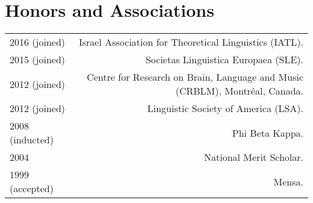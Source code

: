 \documentclass[12pt,letterpaper,twoside]{article}
\makeatletter
\newenvironment{cvsection}{%
  \setlength{\extrarowheight}{0.70ex}
  \begin{longtable}[l]{@{} L R @{}}
}{%
  \end{longtable}
}
\makeatother
\begin{document}
\section*{Honors and Associations}

\begin{cvsection}
  2016 {\footnotesize (joined)} & Israel Association for Theoretical Linguistics (IATL).\\
  2015 {\footnotesize (joined)} & Societas Linguistica Europaea (SLE).\\
  2012 {\footnotesize (joined)} & Centre for Research on Brain, Language and Music (CRBLM), Montr\'{e}al, Canada.\\
  2012 {\footnotesize (joined)} & Linguistic Society of America (LSA).\\
  2008 {\footnotesize (inducted)} & Phi Beta Kappa.\\
  2004 & National Merit Scholar.\\
  1999 {\footnotesize (accepted)} & Mensa.\\
\end{cvsection}
\end{document}
